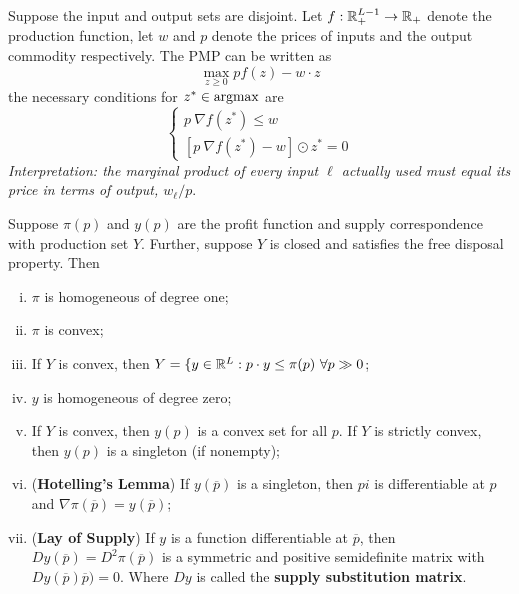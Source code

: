 \documentclass{report}
\begin{document}
	 		\begin{definition}
	 			Suppose the input and output sets are disjoint. Let $f: \mathbb{R}^{L-1}_+ \to \mathbb{R}_+$ denote the production function, let $w$ and $p$ denote the prices of inputs and the output commodity respectively. The PMP can be written as 
	 			\begin{equation}
	 				\max_{z \geq 0} p f(z) - w \cdot z
	 			\end{equation}
	 			the necessary conditions for $z^* \in \operatorname*{argmax}$ are
	 			\begin{equation}
		 			\begin{cases}
		 				p\ \nabla f(z^*) \leq w \\
		 				\left[p\ \nabla f(z^*) - w\right] \odot z^* = 0
		 			\end{cases}
	 			\end{equation}
	 			\emph{Interpretation: the marginal product of every input $\ell$ actually used must equal its price in terms of output, $w_\ell / p$}.
	 		\end{definition}
	 		
	 		\begin{proposition}[5.C.1]
	 			Suppose $\pi(p)$ and $y(p)$ are the profit function and supply correspondence with production set $Y$. Further, suppose $Y$ is closed and satisfies the free disposal property. Then
	 			\begin{enumerate}[(i)]
	 				\item $\pi$ is homogeneous of degree one;
	 				\item $\pi$ is convex;
	 				\item If $Y$ is convex, then $Y = \{y \in \mathbb{R}^L: p \cdot y \leq \pi (p)\ \forall p \gg 0$;
	 				\item $y$ is homogeneous of degree zero;
	 				\item If $Y$ is convex, then $y(p)$ is a convex set for all $p$. If $Y$ is strictly convex, then $y(p)$ is a singleton (if nonempty);
	 				\item (\textbf{Hotelling's Lemma}) If $y(\overline{p})$ is a singleton, then $pi$ is differentiable at $p$ and $\nabla \pi (\overline{p}) = y(\overline{p})$;
	 				\item (\textbf{Lay of Supply}) If $y$ is a function differentiable at $\overline{p}$, then $Dy(\overline{p})=D^2 \pi(\overline{p})$ is a symmetric and positive semidefinite matrix with $Dy(\overline{p}) \overline{p})=0$. Where $Dy$ is called the \textbf{supply substitution matrix}.
	 			\end{enumerate}
	 		\end{proposition}
	 		
\end{document}
